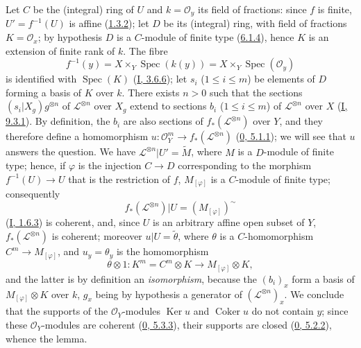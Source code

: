 Let $C$ be the (integral) ring of $U$ and $k=\mathcal{O}_y$ its field of
fractions: since $f$ is finite, $U'=f^{-1}(U)$ is affine
(\hyperref[II.1.3.2]{1.3.2}); let $D$ be its (integral) ring, with field of
fractions $K=\mathcal{O}_x$; by hypothesis $D$ is a $C$-module of finite
type (\hyperref[II.6.1.4]{6.1.4}), hence $K$ is an extension of finite rank
of $k$. The fibre
\[
f^{-1}(y)=X\times_Y\operatorname{Spec}(k(y))
=X\times_Y\operatorname{Spec}(\mathcal{O}_y)
\]
is identified with $\operatorname{Spec}(K)$
(\hyperref[I.3.6.5]{I, 3.6.6}); let $s_i$ ($1\leq i\leq m$) be
elements of $D$ forming a basis of $K$ over $k$. There exists $n>0$ such that
the sections $(s_i|X_g)g^{\otimes n}$ of $\mathcal{L}^{\otimes n}$ over
$X_g$ extend to sections $b_i$ ($1\leq i\leq m$) of
$\mathcal{L}^{\otimes n}$ over $X$
(\hyperref[I.9.3.1]{I, 9.3.1}). By definition, the $b_i$ are also
sections of $f_*(\mathcal{L}^{\otimes n})$ over $Y$, and they therefore
define a homomorphism
$u:\mathcal{O}_Y^m\to f_*(\mathcal{L}^{\otimes n})$
(\hyperref[0.5.1.1]{0, 5.1.1}); we will see that $u$ answers the
question. We have $\mathcal{L}^{\otimes n}|U'=\widetilde{M}$, where $M$ is a
$D$-module of finite type; hence, if $\varphi$ is the injection $C\to D$
corresponding to the morphism $f^{-1}(U)\to U$ that is the restriction of $f$,
$M_{[\varphi]}$ is a $C$-module of finite type; consequently
\[
f_*(\mathcal{L}^{\otimes n})|U=(M_{[\varphi]})^\sim
\]
(\hyperref[I.1.6.3]{I, 1.6.3}) is coherent, and, since $U$ is an arbitrary
affine open subset of $Y$, $f_*(\mathcal{L}^{\otimes n})$ is coherent;
moreover $u|U=\widetilde{\theta}$, where $\theta$ is a $C$-homomorphism
$C^m\to M_{[\varphi]}$, and $u_y=\theta_y$ is the homomorphism
\[
\theta\otimes1:K^m=C^m\otimes K\longrightarrow
M_{[\varphi]}\otimes K,
\]
and the latter is by definition an \emph{isomorphism}, because the $(b_i)_x$
form a basis of $M_{[\varphi]}\otimes K$ over $k$, $g_x$ being by
hypothesis a generator of $(\mathcal{L}^{\otimes n})_x$. We conclude that
the supports of the $\mathcal{O}_Y$-modules $\operatorname{Ker}u$ and
$\operatorname{Coker}u$ do not contain $y$; since these
$\mathcal{O}_Y$-modules are coherent
(\hyperref[0.5.3.3]{0, 5.3.3}), their supports are closed
(\hyperref[0.5.2.2]{0, 5.2.2}), whence the lemma.

